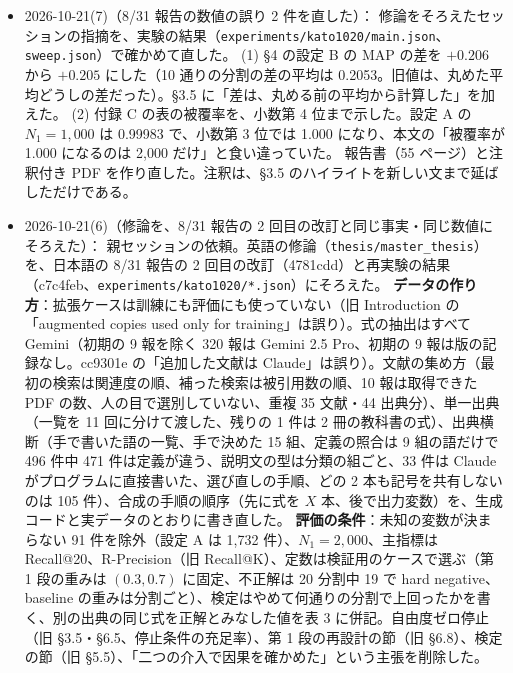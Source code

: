 \documentclass[11pt,a4paper]{jsarticle}
\begin{document}
\begin{itemize}[nosep]
    これに合わせて、いったん決めた 111 件の除外（\texttt{excluded\_cases\_v2.json}、ccb6b91）は取り消して消した。除外は v1 の 91 件に戻り、設定 A は 1{,}732 件。その除外での再実行は途中で止めた（commit していない）。全実験のやり直しを、第 1 段のセッションに依頼する。
  \item 2026-10-21(7)（8/31 報告の数値の誤り 2 件を直した）：
    修論をそろえたセッションの指摘を、実験の結果（\texttt{experiments/kato1020/main.json}、\texttt{sweep.json}）で確かめて直した。
    (1) \S 4 の設定 B の MAP の差を $+0.206$ から $+0.205$ にした（10 通りの分割の差の平均は 0.2053。旧値は、丸めた平均どうしの差だった）。\S 3.5 に「差は、丸める前の平均から計算した」を加えた。
    (2) 付録 C の表の被覆率を、小数第 4 位まで示した。設定 A の $N_1 = 1{,}000$ は 0.99983 で、小数第 3 位では 1.000 になり、本文の「被覆率が 1.000 になるのは 2{,}000 だけ」と食い違っていた。
    報告書（55 ページ）と注釈付き PDF を作り直した。注釈は、\S 3.5 のハイライトを新しい文まで延ばしただけである。
  \item 2026-10-21(6)（修論を、8/31 報告の 2 回目の改訂と同じ事実・同じ数値にそろえた）：
    親セッションの依頼。英語の修論（\texttt{thesis/master\_thesis}）を、日本語の 8/31 報告の 2 回目の改訂（4781cdd）と再実験の結果（c7c4feb、\texttt{experiments/kato1020/*.json}）にそろえた。
    \textbf{データの作り方}：拡張ケースは訓練にも評価にも使っていない（旧 Introduction の「augmented copies used only for training」は誤り）。式の抽出はすべて Gemini（初期の 9 報を除く 320 報は Gemini 2.5 Pro、初期の 9 報は版の記録なし。cc9301e の「追加した文献は Claude」は誤り）。文献の集め方（最初の検索は関連度の順、補った検索は被引用数の順、10 報は取得できた PDF の数、人の目で選別していない、重複 35 文献・44 出典分）、単一出典（一覧を 11 回に分けて渡した、残りの 1 件は 2 冊の教科書の式）、出典横断（手で書いた語の一覧、手で決めた 15 組、定義の照合は 9 組の語だけで 496 件中 471 件は定義が違う、説明文の型は分類の組ごと、33 件は Claude がプログラムに直接書いた、選び直しの手順、どの 2 本も記号を共有しないのは 105 件）、合成の手順の順序（先に式を $X$ 本、後で出力変数）を、生成コードと実データのとおりに書き直した。
    \textbf{評価の条件}：未知の変数が決まらない 91 件を除外（設定 A は 1{,}732 件）、$N_1 = 2{,}000$、主指標は Recall@20、R-Precision（旧 Recall@K）、定数は検証用のケースで選ぶ（第 1 段の重みは $(0.3, 0.7)$ に固定、不正解は 20 分割中 19 で hard negative、baseline の重みは分割ごと）、検定はやめて何通りの分割で上回ったかを書く、別の出典の同じ式を正解とみなした値を表 3 に併記。自由度ゼロ停止（旧 \S 3.5・\S 6.5、停止条件の充足率）、第 1 段の再設計の節（旧 \S 6.8）、検定の節（旧 \S 5.5）、「二つの介入で因果を確かめた」という主張を削除した。

\end{itemize}
\end{document}
